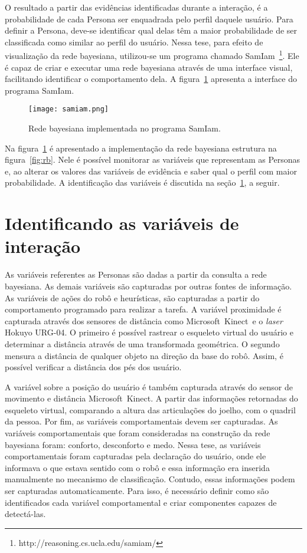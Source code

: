 O resultado a partir das evidências identificadas durante a interação, é a probabilidade de cada Persona ser enquadrada pelo perfil daquele usuário. Para definir a Persona, deve-se identificar qual delas têm a maior probabilidade de ser classificada como similar ao perfil do usuário. Nessa tese, para efeito de visualização da rede bayesiana, utilizou-se um programa chamado SamIam~\footnote{http://reasoning.cs.ucla.edu/samiam/}. Ele é capaz de criar e executar uma rede bayesiana através de uma interface visual, facilitando identificar o comportamento dela. A figura~\ref{fig:samiam} apresenta a interface do programa SamIam.

\begin{figure}[ht!]
	\centering
	\begin{minipage}{\textwidth}
		\caption{Rede bayesiana implementada no programa SamIam.}
		\texttt{[image: samiam.png]}
		\label{fig:samiam}
	\end{minipage}
\end{figure}

Na figura~\ref{fig:samiam} é apresentado a implementação da rede bayesiana estrutura na figura~\ref{fig:rb}. Nele é possível monitorar as variáveis que representam as Personas e, ao alterar os valores das variáveis de evidência e saber qual o perfil com maior probabilidade. A identificação das variáveis é discutida na seção~\ref{sec:idvariavel}, a seguir.

\section{Identificando as variáveis de interação}
\label{sec:idvariavel}
As variáveis referentes as Personas são dadas a partir da consulta a rede bayesiana. As demais variáveis são capturadas por outras fontes de informação. As variáveis de ações do robô e heurísticas, são capturadas a partir do comportamento programado para realizar a tarefa. A variável proximidade é capturada através dos sensores de distância como Microsoft\textregistered\ Kinect\textregistered\ e o \emph{laser} Hokuyo URG-04. O primeiro é possível rastrear o esqueleto virtual do usuário e determinar a distância através de uma transformada geométrica. O segundo mensura a distância de qualquer objeto na direção da base do robô. Assim, é possível verificar a distância dos pés dos usuário.

A variável sobre a posição do usuário é também capturada através do sensor de movimento e distância Microsoft\textregistered\ Kinect\textregistered. A partir das informações retornadas do esqueleto virtual, comparando a altura das articulações do joelho, com o quadril da pessoa. Por fim, as variáveis comportamentais devem ser capturadas. As variáveis comportamentais que foram consideradas na construção da rede bayesiana foram: conforto, desconforto e medo. Nessa tese, as variáveis comportamentais foram capturadas pela declaração do usuário, onde ele informava o que estava sentido com o robô e essa informação era inserida manualmente no mecanismo de classificação. Contudo, essas informações podem ser capturadas automaticamente. Para isso, é necessário definir como são identificados cada variável comportamental e criar componentes capazes de detectá-las.

